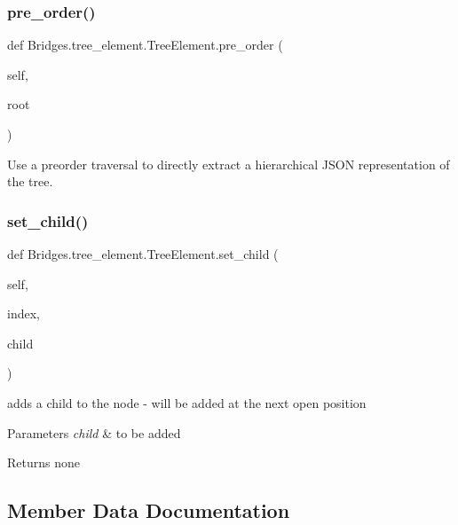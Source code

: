 \subsubsection{\texorpdfstring{pre\+\_\+order()}{pre\_order()}}
{\footnotesize\ttfamily def Bridges.\+tree\+\_\+element.\+Tree\+Element.\+pre\+\_\+order (\begin{DoxyParamCaption}\item[{}]{self,  }\item[{}]{root }\end{DoxyParamCaption})}



Use a preorder traversal to directly extract a hierarchical J\+S\+ON representation of the tree. 

\mbox{\label{class_bridges_1_1tree__element_1_1_tree_element_af6bb2b4b836002c3ebdf0fda35251df5}} 
\subsubsection{\texorpdfstring{set\+\_\+child()}{set\_child()}}
{\footnotesize\ttfamily def Bridges.\+tree\+\_\+element.\+Tree\+Element.\+set\+\_\+child (\begin{DoxyParamCaption}\item[{}]{self,  }\item[{}]{index,  }\item[{}]{child }\end{DoxyParamCaption})}



adds a child to the node -\/ will be added at the next open position 


\begin{DoxyParams}{Parameters}
{\em child} & to be added\\
\hline
\end{DoxyParams}
\begin{DoxyReturn}{Returns}
none 
\end{DoxyReturn}


\subsection{Member Data Documentation}
\mbox{\label{class_bridges_1_1tree__element_1_1_tree_element_ae60bd5a03a4dcfb9cbc75d0f990afc09}} 
